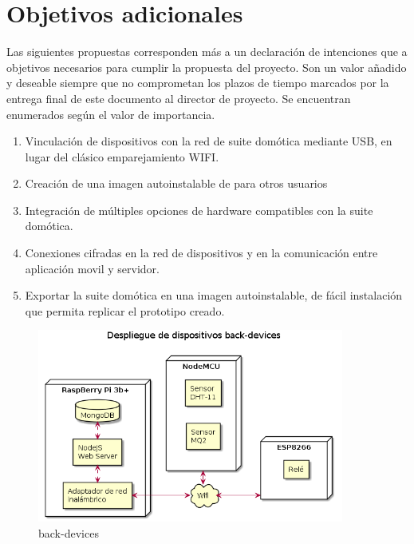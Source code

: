 \section{Objetivos adicionales}
\label{ch:Capitulo3.4}

Las siguientes propuestas corresponden más a un declaración de intenciones que a objetivos necesarios para cumplir la propuesta del proyecto. Son un valor añadido y deseable siempre que no comprometan los plazos de tiempo marcados por la entrega final de este documento al director de proyecto. Se encuentran enumerados según el valor de importancia.

\begin{enumerate}

  \item Vinculación de dispositivos con la red de suite domótica mediante USB, en lugar del clásico emparejamiento WIFI.

  \item Creación de una imagen autoinstalable de para otros usuarios

  \item Integración de múltiples opciones de hardware compatibles con la suite domótica.

  \item Conexiones cifradas en la red de dispositivos y en la comunicación entre aplicación movil y servidor.

  \item Exportar la suite domótica en una imagen autoinstalable, de fácil instalación que permita replicar el prototipo creado.

\end{enumerate}

\begin{figure}[hbt!]
\centering
\includegraphics[height=2.5in]{figures/diagrams/physical-devices/back-devices.png}
\caption[back-devices]{back-devices\footnotemark}
\end{figure}

